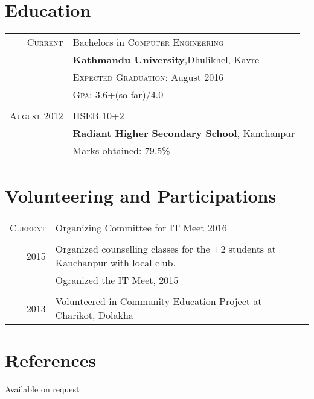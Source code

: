 \documentclass[a4paper,10pt]{article}
\begin{document}
\section{Education}
\begin{tabular}{rl}	
 \textsc{Current}  & Bachelors in \textsc{Computer Engineering}\\
& \textbf{Kathmandu University},Dhulikhel, Kavre\\
& \normalsize \textsc{Expected Graduation}: August 2016\\
& \normalsize \textsc{Gpa}: 3.6+(so far)/4.0\\\\
\textsc{August} 2012& HSEB 10+2 \\ 
&\normalsize\textbf{Radiant Higher Secondary School}, Kanchanpur\\
&Marks obtained: 79.5\%\\
\end{tabular}

\section{Volunteering and Participations}
\begin{tabular}{rl}	
 \textsc{Current}  & Organizing Committee for IT Meet 2016\\\\
 \textsc{2015} & Organized counselling classes for the +2 students at Kanchanpur with local club.\\
 &Ogranized the IT Meet, 2015\\\\
 \textsc{2013} & Volunteered in Community Education Project at Charikot, Dolakha
\end{tabular}

\section{References}
Available on request
\end{document}
